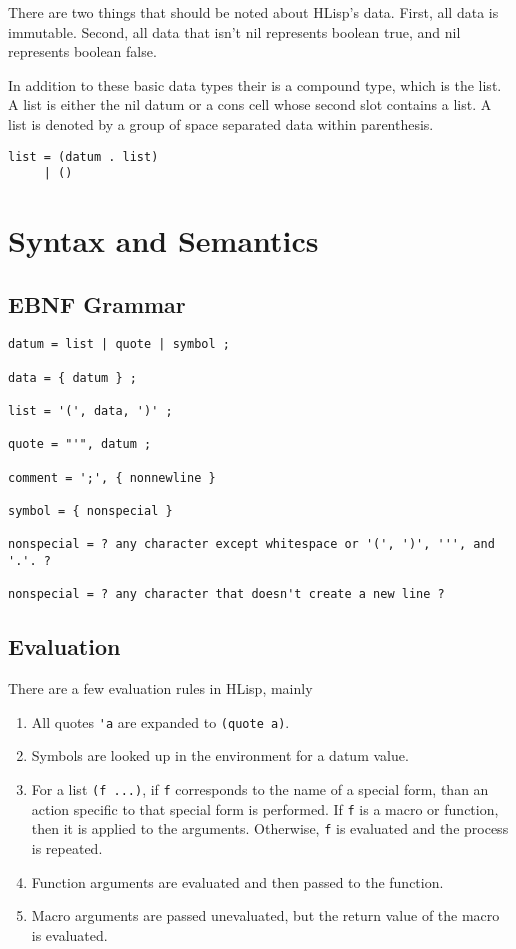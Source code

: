 \documentclass[12pt]{article}
\begin{document}
There are two things that should be noted about HLisp's data. First, all data is
immutable. Second, all data that isn't nil represents boolean true, and nil
represents boolean false.

In addition to these basic data types their is a compound type, which is the
list. A list is either the nil datum or a cons cell whose second slot contains a
list. A list is denoted by a group of space separated data within parenthesis.

\begin{verbatim}
list = (datum . list)
     | ()
\end{verbatim}

\section{Syntax and Semantics}

\subsection{EBNF Grammar}

\begin{verbatim}
datum = list | quote | symbol ;

data = { datum } ;

list = '(', data, ')' ;

quote = "'", datum ;

comment = ';', { nonnewline }

symbol = { nonspecial }

nonspecial = ? any character except whitespace or '(', ')', ''', and '.'. ?

nonspecial = ? any character that doesn't create a new line ?
\end{verbatim}

\subsection{Evaluation}

There are a few evaluation rules in HLisp, mainly

\begin{enumerate}
\item All quotes \verb!'a! are expanded to \verb!(quote a)!.

\item Symbols are looked up in the environment for a datum value.

\item For a list \verb!(f ...)!, if \verb!f! corresponds to the name of a
  special form, than an action specific to that special form is performed. If
  \verb!f! is a macro or function, then it is applied to the
  arguments. Otherwise, \verb!f! is evaluated and the process is repeated.

\item Function arguments are evaluated and then passed to the function.

\item Macro arguments are passed unevaluated, but the return value of the macro
  is evaluated.
\end{enumerate}
\end{document}
